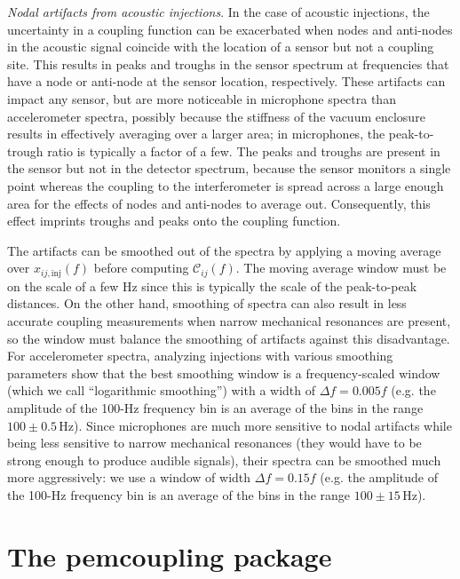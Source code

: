 \textit{Nodal artifacts from acoustic injections}.
In the case of acoustic injections, the uncertainty in a coupling function can be exacerbated when nodes and anti-nodes in the acoustic signal coincide with the location of a sensor but not a coupling site.
This results in peaks and troughs in the sensor spectrum at frequencies that have a node or anti-node at the sensor location, respectively.
These artifacts can impact any sensor, but are more noticeable in microphone spectra than accelerometer spectra, possibly because the stiffness of the vacuum enclosure results in effectively averaging over a larger area; in microphones, the peak-to-trough ratio is typically a factor of a few.
The peaks and troughs are present in the sensor but not in the detector spectrum, because the sensor monitors a single point whereas the coupling to the interferometer is spread across a large enough area for the effects of nodes and anti-nodes to average out.
Consequently, this effect imprints troughs and peaks onto the coupling function.

The artifacts can be smoothed out of the spectra by applying a moving average over $x_{ij,\mathrm{inj}}(f)$ before computing $\mathcal{C}_{ij}(f)$.
The moving average window must be on the scale of a few Hz since this is typically the scale of the peak-to-peak distances.
On the other hand, smoothing of spectra can also result in less accurate coupling measurements when narrow mechanical resonances are present, so the window must balance the smoothing of artifacts against this disadvantage.
For accelerometer spectra, analyzing injections with various smoothing parameters show that the best smoothing window is a frequency-scaled window (which we call ``logarithmic smoothing'') with a width of $\Delta f = 0.005 f$ (e.g. the amplitude of the 100-Hz frequency bin is an average of the bins in the range $100 \pm 0.5$\,Hz).
Since microphones are much more sensitive to nodal artifacts while being less sensitive to narrow mechanical resonances (they would have to be strong enough to produce audible signals), their spectra can be smoothed much more aggressively: we use a window of width $\Delta f = 0.15 f$ (e.g. the amplitude of the 100-Hz frequency bin is an average of the bins in the range $100 \pm 15$\,Hz).


\section{The {\selectfont pemcoupling}\xspace package}
\label{sec:pemcoupling}


